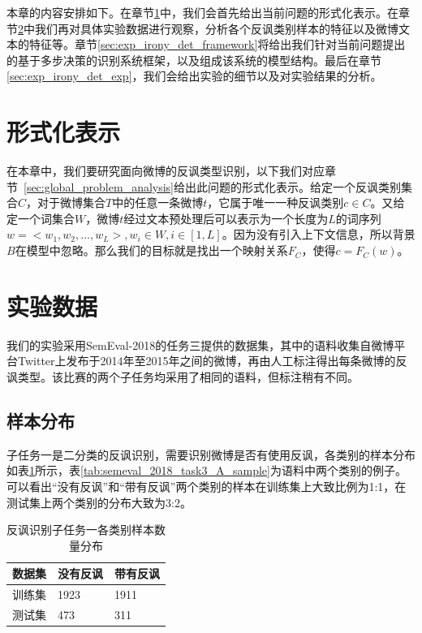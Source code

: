 本章的内容安排如下。在章节\ref{sec:exp_irony_det_format}中，我们会首先给出当前问题的形式化表示。在章节\ref{sec:exp_irony_det_data}中我们再对具体实验数据进行观察，分析各个反讽类别样本的特征以及微博文本的特征等。章节\ref{sec:exp_irony_det_framework}将给出我们针对当前问题提出的基于多步决策的识别系统框架，以及组成该系统的模型结构。最后在章节\ref{sec:exp_irony_det_exp}，我们会给出实验的细节以及对实验结果的分析。

\section{形式化表示}
\label{sec:exp_irony_det_format}

在本章中，我们要研究面向微博的反讽类型识别，以下我们对应章节~\ref{sec:global_problem_analysis}给出此问题的形式化表示。给定一个反讽类别集合$C$，对于微博集合$T$中的任意一条微博$t$，它属于唯一一种反讽类别$c \in C$。又给定一个词集合$W$，微博$t$经过文本预处理后可以表示为一个长度为$L$的词序列 $w = <w_1, w_2, ..., w_L>, w_i \in W, i \in [1, L]$。因为没有引入上下文信息，所以背景$B$在模型中忽略。那么我们的目标就是找出一个映射关系$F_C$，使得$c=F_C(w)$。

\section{实验数据}
\label{sec:exp_irony_det_data}

我们的实验采用SemEval-2018的任务三提供的数据集，其中的语料收集自微博平台Twitter上发布于2014年至2015年之间的微博，再由人工标注得出每条微博的反讽类型。该比赛的两个子任务均采用了相同的语料，但标注稍有不同。

\subsection{样本分布}

子任务一是二分类的反讽识别，需要识别微博是否有使用反讽，各类别的样本分布如表\ref{tab:semeval_2018_task3_A_data}所示，表\ref{tab:semeval_2018_task3_A_sample}为语料中两个类别的例子。可以看出“没有反讽”和“带有反讽”两个类别的样本在训练集上大致比例为1:1，在测试集上两个类别的分布大致为3:2。

\begin{table}[htb]
  \centering
  \begin{minipage}[t]{0.7\linewidth} %
  \caption{反讽识别子任务一各类别样本数量分布}
  \label{tab:semeval_2018_task3_A_data}
    \begin{tabularx}{\linewidth}{X|XX}
    \toprule[1.5pt]
    数据集 & 没有反讽 & 带有反讽 \\  
    \hline
    训练集 & 1923 & 1911 \\
    测试集 & 473  & 311 \\
    \bottomrule[1.5pt]
    \end{tabularx}
  \end{minipage}
\end{table}

